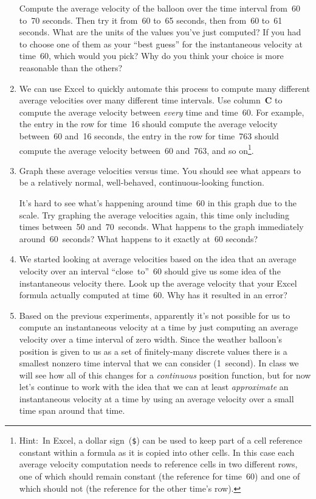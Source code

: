\begin{enumerate}
	Compute the average velocity of the balloon over the time interval from~60 to~70 seconds. Then try it from~60 to~65 seconds, then from~60 to~61 seconds. What are the units of the values you've just computed? If you had to choose one of them as your ``best guess'' for the instantaneous velocity at time~60, which would you pick? Why do you think your choice is more reasonable than the others?
	
	\newpage
	
	\item We can use Excel to quickly automate this process to compute many different average velocities over many different time intervals. Use column~\textbf{C} to compute the average velocity between \textit{every} time and time~60. For example, the entry in the row for time~16 should compute the average velocity between~60 and~16 seconds, the entry in the row for time~763 should compute the average velocity between~60 and~763, and so on\footnote{Hint:~In Excel, a dollar sign~(\texttt{\$}) can be used to keep part of a cell reference constant within a formula as it is copied into other cells. In this case each average velocity computation needs to reference cells in two different rows, one of which should remain constant (the reference for time~60) and one of which should not (the reference for the other time's row).}.
	
	\item Graph these average velocities versus time. You should see what appears to be a relatively normal, well-behaved, continuous-looking function.
	
	It's hard to see what's happening around time~60 in this graph due to the scale. Try graphing the average velocities again, this time only including times between~50 and~70~seconds. What happens to the graph immediately around~60~seconds? What happens to it exactly at~60 seconds?
	
	\item We started looking at average velocities based on the idea that an average velocity over an interval ``close~to''~60 should give us some idea of the instantaneous velocity there. Look up the average velocity that your Excel formula actually computed at time~60. Why has it resulted in an error?
	
	\item Based on the previous experiments, apparently it's not possible for us to compute an instantaneous velocity at a time by just computing an average velocity over a time interval of zero width. Since the weather balloon's position is given to us as a set of finitely-many discrete values there is a smallest nonzero time interval that we can consider (1~second). In class we will see how all of this changes for a \textit{continuous} position function, but for now let's continue to work with the idea that we can at least \textit{approximate} an instantaneous velocity at a time by using an average velocity over a small time span around that time.
	

\end{enumerate}
